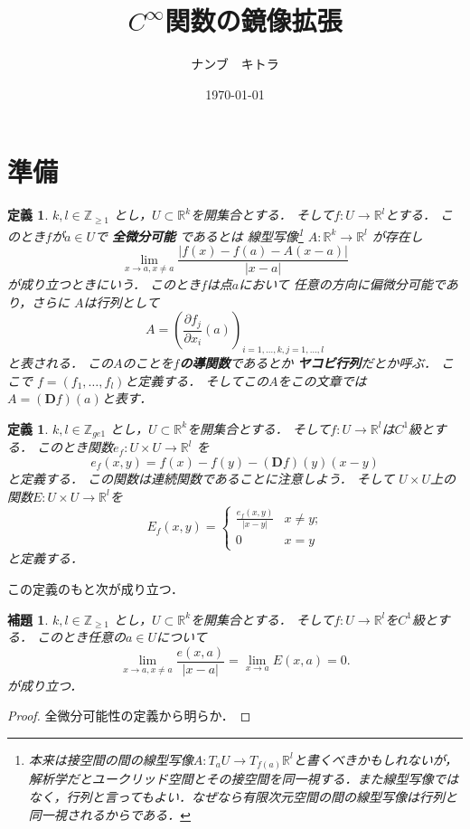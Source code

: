 \documentclass[leqno, a4paper, 12pt]{jsarticle}
\title{$C^{\infty}$関数の鏡像拡張}
\author{ナンブ　キトラ}
\date{\today}
\newtheorem{lem}[thm]{補題}
\newtheorem{df}[thm]{定義}
\newcommand{\zz}{\mathbb{Z}}
\newcommand{\rr}{\mathbb{R}}
\newcommand{\ddd}{\mathbf{D}}
\begin{document}
\maketitle


\section{準備}


\begin{df}
$k, l\in \zz_{\ge 1}$
とし，$U\subset \rr^{k}$を開集合とする．
そして$f: U\to \rr^{l}$とする．
このとき$f$が$a\in U$で
\textbf{全微分可能}
であるとは
線型写像\footnote{本来は接空間の間の線型写像$A: T_{a}U\to T_{f(a)}\rr^{l}$と書くべきかもしれないが，解析学だとユークリッド空間とその接空間を同一視する．また線型写像ではなく，行列と言ってもよい．なぜなら有限次元空間の間の線型写像は行列と同一視されるからである．}
$A: \rr^{k}\to \rr^{l}$
が存在し
\[
\lim_{x\to a, x\neq a}
\frac{|f(x)-f(a)-A(x-a)|}{|x-a|}
\]
が成り立つときにいう．
このとき$f$は点$a$において
任意の方向に偏微分可能であり，さらに
$A$は行列として
\[
A=\left(\frac{\partial f_{j}}{\partial x_{i}}(a)\right)_{i=1, \dots, k, j=1, \dots, l}
\]
と表される．
この$A$のことを\textbf{$f$の導関数}であるとか
\textbf{ヤコビ行列}だとか呼ぶ．
ここで
$f=(f_{1}, \dots, f_{l})$と定義する．
そしてこの$A$をこの文章では
$A=(\ddd f)(a)$と表す．
\end{df}


\begin{df}
$k, l\in \zz_{ge 1}$
とし，$U\subset \rr^{k}$を開集合とする．
そして$f: U\to \rr^{l}$は$C^{1}$級とする．
このとき関数$e_{f}: U\times U\to \rr^{l}$
を
\[
e_{f}(x, y)=f(x)-f(y)-(\ddd f)(y)(x-y)
\]
と定義する．
この関数は連続関数であることに注意しよう．
そして
$U\times U$上の
関数$E: U\times U\to \rr^{l}$を
\[
E_{f}(x, y)=
\begin{cases}
\frac{e_{f}(x, y)}{|x-y|} & \text{$x\neq y$;}\\
0 & \text{$x=y$}
\end{cases}
\]
と定義する．
\end{df}

この定義のもと次が成り立つ．
\begin{lem}\label{lem:1step}
$k, l\in \zz_{\ge 1}$
とし，$U\subset \rr^{k}$を開集合とする．
そして$f: U\to \rr^{l}$を$C^{1}$級とする．
このとき任意の$a\in U$について
\[
\lim_{x\to a, x\neq a}\frac{e(x, a)}{|x-a|}
=\lim_{x\to a}E(x, a)=0. 
\]
が成り立つ．

\end{lem}
\begin{proof}
全微分可能性の定義から明らか．
\end{proof}
\end{document}
